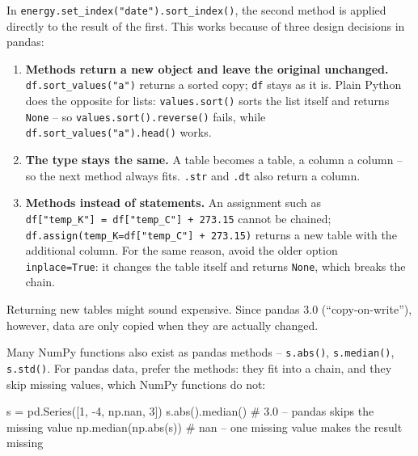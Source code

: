 \documentclass[
  letterpaper,
  DIV=11,
  numbers=noendperiod]{scrreprt}
\newenvironment{Shaded}{\begin{snugshade}}{\end{snugshade}}
\newcommand{\BuiltInTok}[1]{\textcolor[rgb]{0.00,0.23,0.31}{#1}}
\newcommand{\CommentTok}[1]{\textcolor[rgb]{0.37,0.37,0.37}{#1}}
\newcommand{\DecValTok}[1]{\textcolor[rgb]{0.68,0.00,0.00}{#1}}
\newcommand{\NormalTok}[1]{\textcolor[rgb]{0.00,0.23,0.31}{#1}}
\newcommand{\OperatorTok}[1]{\textcolor[rgb]{0.37,0.37,0.37}{#1}}
\providecommand{\tightlist}{%
  \setlength{\itemsep}{0pt}\setlength{\parskip}{0pt}}\usepackage{longtable,booktabs,array}
\begin{document}
\begin{tcolorbox}[enhanced jigsaw, left=2mm, title=\textcolor{quarto-callout-tip-color}{\faLightbulb}\hspace{0.5em}{Method chaining -- and why pandas makes it possible}, opacityback=0, breakable, rightrule=.15mm, arc=.35mm, toptitle=1mm, colbacktitle=quarto-callout-tip-color!10!white, opacitybacktitle=0.6, coltitle=black, colframe=quarto-callout-tip-color-frame, bottomrule=.15mm, leftrule=.75mm, bottomtitle=1mm, titlerule=0mm, toprule=.15mm, colback=white]

In \texttt{energy.set\_index("date").sort\_index()}, the second method
is applied directly to the result of the first. This works because of
three design decisions in pandas:

\begin{enumerate}
\def\labelenumi{\arabic{enumi}.}
\tightlist
\item
  \textbf{Methods return a new object and leave the original unchanged.}
  \texttt{df.sort\_values("a")} returns a sorted copy; \texttt{df} stays
  as it is. Plain Python does the opposite for lists:
  \texttt{values.sort()} sorts the list itself and returns \texttt{None}
  -- so \texttt{values.sort().reverse()} fails, while
  \texttt{df.sort\_values("a").head()} works.
\item
  \textbf{The type stays the same.} A table becomes a table, a column a
  column -- so the next method always fits. \texttt{.str} and
  \texttt{.dt} also return a column.
\item
  \textbf{Methods instead of statements.} An assignment such as
  \texttt{df{[}"temp\_K"{]}\ =\ df{[}"temp\_C"{]}\ +\ 273.15} cannot be
  chained; \texttt{df.assign(temp\_K=df{[}"temp\_C"{]}\ +\ 273.15)}
  returns a new table with the additional column. For the same reason,
  avoid the older option \texttt{inplace=True}: it changes the table
  itself and returns \texttt{None}, which breaks the chain.
\end{enumerate}

Returning new tables might sound expensive. Since pandas 3.0
(``copy-on-write''), however, data are only copied when they are
actually changed.

Many NumPy functions also exist as pandas methods -- \texttt{s.abs()},
\texttt{s.median()}, \texttt{s.std()}. For pandas data, prefer the
methods: they fit into a chain, and they skip missing values, which
NumPy functions do not:

\begin{Shaded}
\begin{Highlighting}[]
\NormalTok{s }\OperatorTok{=}\NormalTok{ pd.Series([}\DecValTok{1}\NormalTok{, }\OperatorTok{{-}}\DecValTok{4}\NormalTok{, np.nan, }\DecValTok{3}\NormalTok{])}
\NormalTok{s.}\BuiltInTok{abs}\NormalTok{().median()            }\CommentTok{\# 3.0 – pandas skips the missing value}
\NormalTok{np.median(np.}\BuiltInTok{abs}\NormalTok{(s))        }\CommentTok{\# nan – one missing value makes the result missing}
\end{Highlighting}
\end{Shaded}


\end{tcolorbox}
\end{document}
